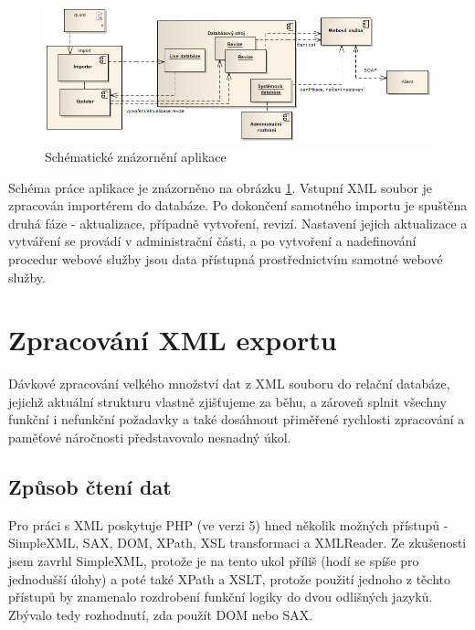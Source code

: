 \documentclass[11pt,twoside,a4paper]{book}
\begin{document}
\begin{figure}[h]
\begin{center}
\includegraphics[width=13cm]{figures/struktura.png}
\caption{Schématické znázornění aplikace}
\label{fig:struktura}
\end{center}
\end{figure}

Schéma práce aplikace je znázorněno na obrázku \ref{fig:struktura}. Vstupní XML soubor je zpracován importérem do  databáze. Po dokončení samotného importu je spuštěna druhá fáze - aktualizace, případně vytvoření, revizí. Nastavení jejich aktualizace a vytváření se provádí v administrační části, a po vytvoření a nadefinování procedur webové služby jsou data přístupná prostřednictvím samotné webové služby.


\section{Zpracování XML exportu}
Dávkové zpracování velkého množství dat z XML souboru do relační databáze, jejichž aktuální strukturu vlastně zjišťujeme za běhu, a zároveň splnit všechny funkční i nefunkční požadavky a také dosáhnout přiměřené rychlosti zpracování a paměťové náročnosti představovalo nesnadný úkol.

\subsection{Způsob čtení dat}
Pro práci s XML poskytuje PHP (ve verzi 5) hned několik možných přístupů - SimpleXML, SAX, DOM, XPath, XSL transformaci a XMLReader\cite{kosek:phpAxml}. Ze zkušenosti jsem zavrhl SimpleXML, protože je na tento ukol příliš  (hodí se spíše pro jednodušší úlohy) a poté také XPath a XSLT, protože použití jednoho z těchto přístupů by znamenalo rozdrobení funkční logiky do dvou odlišných jazyků. Zbývalo tedy rozhodnutí, zda použít DOM nebo SAX.
\end{document}
